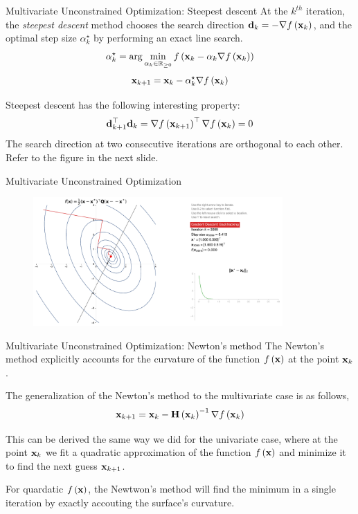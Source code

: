 \documentclass[aspectratio=169]{beamer}
\def\mf{\ensuremath\mathbf}
\def\mb{\ensuremath\mathbb}
\def\lp{\ensuremath\left(}
\def\rp{\ensuremath\right)}
\def\R{\ensuremath\mb{R}}
\newcommand{\ct}[1]{\lp #1\rp}
\begin{document}
\begin{frame} {Multivariate Unconstrained Optimization: Steepest descent}
  At the $k^{th}$ iteration, the \textit{steepest descent} method chooses the search direction $\mf{d}_k = -\nabla f\ct{\mf{x}_k}$, and the optimal step size $\alpha_k^\star$ by performing an exact line search.
  \[ \alpha_k^{\star} = \arg \min_{\alpha_k \in \R_{\geq 0}} f\ct{\mf{x}_k - \alpha_k \nabla f\ct{\mf{x}_k}} \]
  \[ \mf{x}_{k+1} = \mf{x}_{k} - \alpha_k^\star \nabla f\ct{\mf{x}_k} \]

  Steepest descent has the following interesting property:
  \[ \mf{d}_{k+1}^\top\mf{d}_{k} = \nabla f\ct{\mf{x}_{k+1}}^\top \nabla f\ct{\mf{x}_k} = 0 \]
  The search direction at two consecutive iterations are orthogonal to each other. Refer to the figure in the next slide.
\end{frame}


\begin{frame}{Multivariate Unconstrained Optimization}
  \begin{figure}
    \centering
    \includegraphics[width=0.85\textwidth]{figs/multivar_steepdesc.pdf}
  \end{figure}
\end{frame}


\begin{frame} {Multivariate Unconstrained Optimization: Newton's method}
  The Newton's method explicitly accounts for the curvature of the function $f\ct{\mf{x}}$ at the point $\mf{x}_k$. 
  \vspace{0.25cm}
  
  The generalization of the Newton's method to the multivariate case is as follows,
  \[ \mf{x}_{k+1} = \mf{x}_{k} - \mf{H}\ct{\mf{x}_k}^{-1}\nabla f\ct{\mf{x}_k} \]
  
  This can be derived the same way we did for the univariate case, where at the point $\mf{x}_k$ we fit a quadratic approximation of the function $f\ct{\mf{x}}$ and minimize it to find the next guess $\mf{x}_{k+1}$.
  \vspace{0.2cm}
  
  For quardatic $f\ct{\mf{x}}$, the Newtwon's method will find the minimum in a single iteration by exactly accouting the surface's curvature.
\end{frame}
\end{document}
